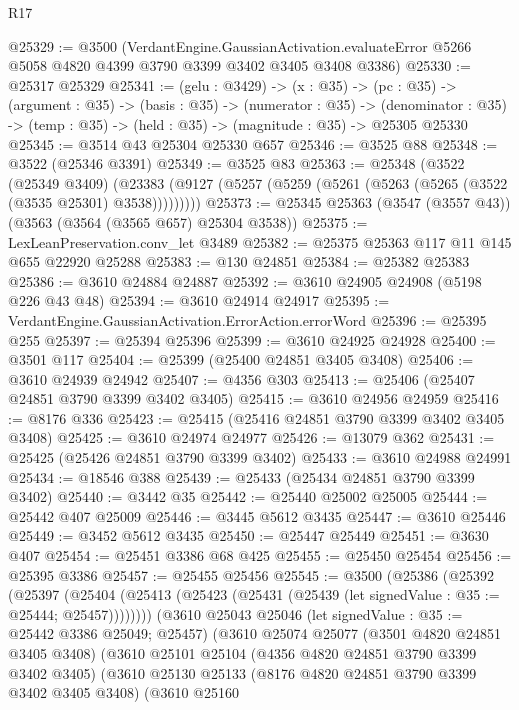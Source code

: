\begin{lexlean}{R17}
\begin{coremodule}
@25329 := @3500
    (VerdantEngine.GaussianActivation.evaluateError
      @5266
      @5058
      @4820
      @4399
      @3790
      @3399
      @3402
      @3405
      @3408
      @3386)
@25330 := @25317 @25329
@25341 := (gelu : @3429) ->
  (x : @35) ->
  (pc : @35) ->
  (argument : @35) ->
  (basis : @35) ->
  (numerator : @35) ->
  (denominator : @35) -> (temp : @35) -> (held : @35) -> (magnitude : @35) -> @25305 @25330
@25345 := @3514 @43 @25304 @25330 @657
@25346 := @3525 @88
@25348 := @3522 (@25346 @3391)
@25349 := @3525 @83
@25363 := @25348
    (@3522
      (@25349 @3409)
      (@23383 (@9127 (@5257 (@5259 (@5261 (@5263 (@5265 (@3522 (@3535 @25301) @3538)))))))))
@25373 := @25345 @25363 (@3547 (@3557 @43)) (@3563 (@3564 (@3565 @657) @25304 @3538))
@25375 := LexLeanPreservation.conv_let @3489
@25382 := @25375 @25363 @117 @11 @145 @655 @22920 @25288
@25383 := @130 @24851
@25384 := @25382 @25383
@25386 := @3610 @24884 @24887
@25392 := @3610 @24905 @24908 (@5198 @226 @43 @48)
@25394 := @3610 @24914 @24917
@25395 := VerdantEngine.GaussianActivation.ErrorAction.errorWord
@25396 := @25395 @255
@25397 := @25394 @25396
@25399 := @3610 @24925 @24928
@25400 := @3501 @117
@25404 := @25399 (@25400 @24851 @3405 @3408)
@25406 := @3610 @24939 @24942
@25407 := @4356 @303
@25413 := @25406 (@25407 @24851 @3790 @3399 @3402 @3405)
@25415 := @3610 @24956 @24959
@25416 := @8176 @336
@25423 := @25415 (@25416 @24851 @3790 @3399 @3402 @3405 @3408)
@25425 := @3610 @24974 @24977
@25426 := @13079 @362
@25431 := @25425 (@25426 @24851 @3790 @3399 @3402)
@25433 := @3610 @24988 @24991
@25434 := @18546 @388
@25439 := @25433 (@25434 @24851 @3790 @3399 @3402)
@25440 := @3442 @35
@25442 := @25440 @25002 @25005
@25444 := @25442 @407 @25009
@25446 := @3445 @5612 @3435
@25447 := @3610 @25446
@25449 := @3452 @5612 @3435
@25450 := @25447 @25449
@25451 := @3630 @407
@25454 := @25451 @3386 @68 @425
@25455 := @25450 @25454
@25456 := @25395 @3386
@25457 := @25455 @25456
@25545 := @3500
    (@25386
      (@25392
        (@25397
          (@25404 (@25413 (@25423 (@25431 (@25439 (let signedValue : @35 := @25444; @25457))))))))
      (@3610
        @25043
        @25046
        (let signedValue : @35 := @25442 @3386 @25049; @25457)
        (@3610
          @25074
          @25077
          (@3501 @4820 @24851 @3405 @3408)
          (@3610
            @25101
            @25104
            (@4356 @4820 @24851 @3790 @3399 @3402 @3405)
            (@3610
              @25130
              @25133
              (@8176 @4820 @24851 @3790 @3399 @3402 @3405 @3408)
              (@3610
                @25160

\end{coremodule}
\end{lexlean}
